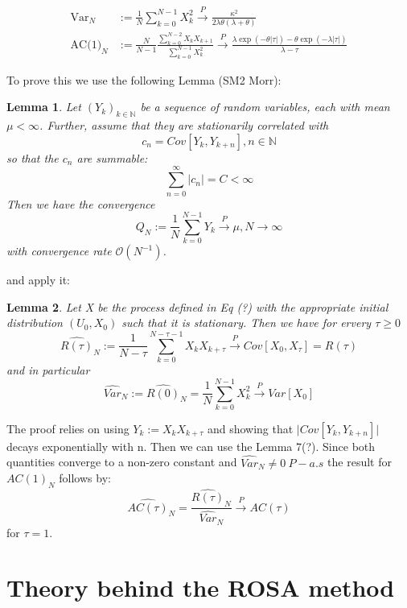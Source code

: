 \documentclass[%
thesis=student,%
coverpage=false,%
titlepage=false,%
headmarks=true, %
german,%
font=libertine, %
math=newpxtx, %
BCOR=5mm,%
coverBCOR=11mm%
]{tumbook}
\newtheorem{lemma}{Lemma}
\begin{document}
\begin{subequations}
        \begin{align*}
            \text{Var}_{N} &:= \frac{1}{N}\sum_{k=0}^{N-1}X_{k}^{2} \xrightarrow{P} \frac{\kappa^{2}}{2\lambda\theta(\lambda + \theta)} \\
            \text{AC(1)}_{N} &:= \frac{N}{N-1}\frac{\sum_{k=0}^{N-2}X_{k}X_{k+1}}{\sum_{k=0}^{N-1}X_{k}^{2}} \xrightarrow{P} \frac{\lambda\exp(-\theta\lvert\tau\rvert) - \theta\exp(-\lambda\lvert\tau\rvert)}{\lambda - \tau}
        \end{align*}
\end{subequations}

To prove this we use the following Lemma (SM2 Morr):

\begin{lemma}
    Let $(Y_{k})_{k\in \mathbb{N}}$ be a sequence of random variables, each with mean $\mu < \infty$. Further, assume that they are stationarily correlated with
    \[
    c_{n} = Cov[Y_{k},Y_{k+n}], n \in \mathbb{N}
    \]
    so that the $c_{n}$ are summable:
    \[
    \sum_{n=0}^{\infty}\lvert c_{n} \rvert = C < \infty
    \]
    Then we have the convergence
    \[
    Q_{N} := \frac{1}{N}\sum_{k=0}^{N-1}Y_{k} \xrightarrow{P} \mu, N \rightarrow \infty
    \]
    with convergence rate $\mathcal{O}(N^{-1})$.
\end{lemma}

and apply it:

\begin{lemma}
    Let X be the process defined in Eq (?) with the appropriate initial distribution $(U_{0},X_{0})$ such that it is stationary. Then we have for ervery $\tau \geq 0$
    \[
    \hat{R(\tau)}_{N} := \frac{1}{N-\tau} \sum_{k=0}^{N-\tau -1} X_{k}X_{k+\tau} \xrightarrow{P} Cov[X_{0},X_{\tau}] = R(\tau)
    \]
    and in particular
    \[
    \hat{Var}_{N} := \hat{R(0)}_{N} = \frac{1}{N} \sum_{k=0}^{N-1} X_{k}^{2} \xrightarrow{P}Var[X_{0}]
    \]
\end{lemma}

The proof relies on using $Y_{k} := X_{k}X_{k+\tau}$ and showing that $\lvert Cov[Y_{k},Y_{k+n}] \rvert$ decays exponentially with n. Then we can use the Lemma 7(?). Since both quantities converge to a non-zero constant and $\hat{Var}_N \neq 0 \ P-a.s$ the result for $AC(1)_{N}$ follows by:
\[
\hat{AC(\tau)}_N = \frac{\hat{R(\tau)}_{N}}{\hat{Var}_{N}} \xrightarrow{P} AC(\tau)
\]
for $\tau = 1$.



\chapter{Theory behind the ROSA method}
\end{document}
